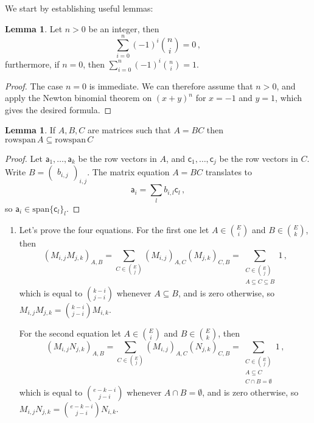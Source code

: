 \documentclass[kulak]{tplt}
\theoremstyle{definition}
\newtheorem{lm}[thm]{Lemma}
\newcommand{\va}{\mathsf{a}}
\newcommand{\vc}{\mathsf{c}}
\newcommand{\spn}{\mathrm{span}}
\newcommand{\rowspn}{\mathrm{rowspan}}
\begin{document}
\begin{enumerate}
We start by establishing useful lemmas:
\begin{lm}\label{lm:binsum}
Let $n> 0$ be an integer, then
$$ \sum_{i=0}^n (-1)^i\binom{n}{i} = 0 \, ,$$
furthermore, if $n=0$, then $\sum_{i=0}^n (-1)^i\binom{n}{i} = 1$.
\end{lm}

\begin{proof}
The case $n=0$ is immediate.
We can therefore assume that $n>0$, and apply the Newton binomial theorem on $(x+y)^n$ for $x = -1$ and $y = 1$, which gives the desired formula. 
\end{proof}


\begin{lm}\label{lm:rowspan}
If $A, B, C$ are matrices such that $A = BC$ then $\rowspn \, A \subseteq \rowspn \, C$
\end{lm}

\begin{proof}
Let $\va_1, \ldots , \va_k$ be the row vectors in $A$, and $\vc_1, \ldots, \vc_j$ be the row vectors in $C$.
Write $B = \begin{pmatrix}
b_{i, j}
\end{pmatrix}_{i, j}$.
The matrix equation $A = BC$ translates to
$$ \va_i = \sum_l b_{i, l} \vc_l \, ,$$
so $\va_i \in \spn \{\vc_l\}_l$.
\end{proof}

\begin{enumerate}
\item 
Let's prove the four equations.
For the first one let $A \in \binom{E}{i}$ and $B \in \binom{E}{k}$, then
$$(M_{i, j} M_{j, k})_{A, B} = \sum_{C \in \binom{E}{j}} (M_{i, j})_{A, C}( M_{j, k})_{C, B} = \sum_{\substack{C \in \binom{E}{j} \\ A \subseteq C \subseteq B }} 1\, ,$$
which is equal to $\binom{k-i}{j-i}$ whenever $A\subseteq B$, and is zero otherwise, so
$M_{i, j} M_{j, k} = \binom{k-i}{j-i}M_{i, k}$.

For the second equation let $A \in \binom{E}{i}$ and $B \in \binom{E}{k}$, then
$$(M_{i, j} N_{j, k})_{A, B} = \sum_{C \in \binom{E}{j}} (M_{i, j})_{A, C}( N_{j, k})_{C, B} = \sum_{\substack{C \in \binom{E}{j} \\ A \subseteq C \\ C \cap B = \emptyset }} 1 \, ,
$$
which is equal to $\binom{e-k-i}{j-i}$ whenever $A\cap B = \emptyset $, and is zero otherwise, so
$M_{i, j} N_{j, k} = \binom{e-k-i}{j-i}N_{i, k}$.


\end{enumerate}
\end{enumerate}
\end{document}
